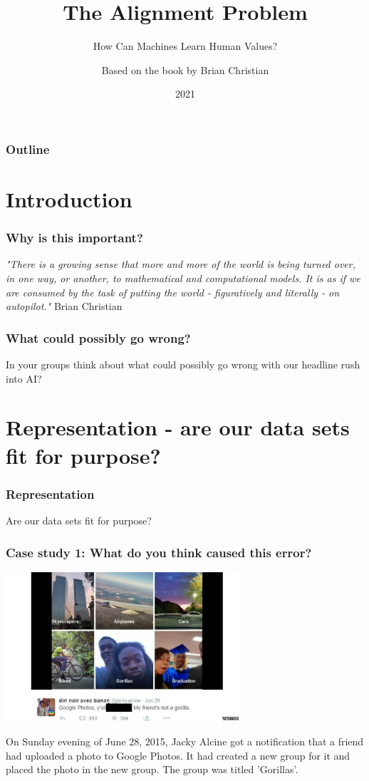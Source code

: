 \documentclass{beamer}
\title{The Alignment Problem}
\subtitle{How Can Machines Learn Human Values?}
\author{Based on the book by Brian Christian}
\date{2021}
\begin{document}
\frame{\titlepage}


\begin{frame}
\frametitle{Outline}
\tableofcontents
\end{frame}

\section{Introduction}

\begin{frame}
\frametitle{Why is this important?}
\emph{"There is a growing sense that more and more of the world is being turned over, in one way, or another, to mathematical and computational models. It is as if we are consumed by the task of putting the world - figuratively and literally - on autopilot."} Brian Christian
\end{frame}

\begin{frame}
\frametitle{What could possibly go wrong?}
In your groups think about what could possibly go wrong with our headline rush into AI?
\end{frame}


\section[Representation]{Representation - are our data sets fit for purpose?}

\begin{frame}
\frametitle{Representation}
\Large{Are our data sets fit for purpose?}
\end{frame}



\begin{frame}
\frametitle{Case study 1: What do you think caused this error?}
\begin{center}
\includegraphics[width=0.65\textwidth]{./images/gorillas.jpg}
\end{center}
On Sunday evening of June 28, 2015, Jacky Alcine got a notification that a friend had uploaded a photo to Google Photos. It had created a new group for it and placed the photo in the new group. The group was titled 'Gorillas'.
\end{frame}
\end{document}
